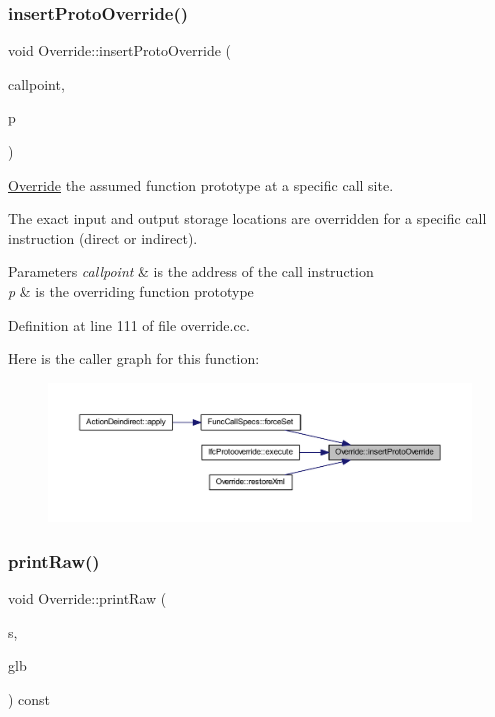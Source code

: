 \subsubsection{\texorpdfstring{insertProtoOverride()}{insertProtoOverride()}}
{\footnotesize\ttfamily void Override\+::insert\+Proto\+Override (\begin{DoxyParamCaption}\item[{const \mbox{\hyperlink{class_address}{Address}} \&}]{callpoint,  }\item[{\mbox{\hyperlink{class_func_proto}{Func\+Proto}} $\ast$}]{p }\end{DoxyParamCaption})}



\mbox{\hyperlink{class_override}{Override}} the assumed function prototype at a specific call site. 

The exact input and output storage locations are overridden for a specific call instruction (direct or indirect). 
\begin{DoxyParams}{Parameters}
{\em callpoint} & is the address of the call instruction \\
\hline
{\em p} & is the overriding function prototype \\
\hline
\end{DoxyParams}


Definition at line 111 of file override.\+cc.

Here is the caller graph for this function\+:
\nopagebreak
\begin{figure}[H]
\begin{center}
\leavevmode
\includegraphics[width=350pt]{class_override_abf08af570f603eaf60f36f61c3a275ae_icgraph}
\end{center}
\end{figure}
\mbox{\label{class_override_a8892cbe3b73a6deb23345088f86f5593}} 
\subsubsection{\texorpdfstring{printRaw()}{printRaw()}}
{\footnotesize\ttfamily void Override\+::print\+Raw (\begin{DoxyParamCaption}\item[{ostream \&}]{s,  }\item[{\mbox{\hyperlink{class_architecture}{Architecture}} $\ast$}]{glb }\end{DoxyParamCaption}) const}



